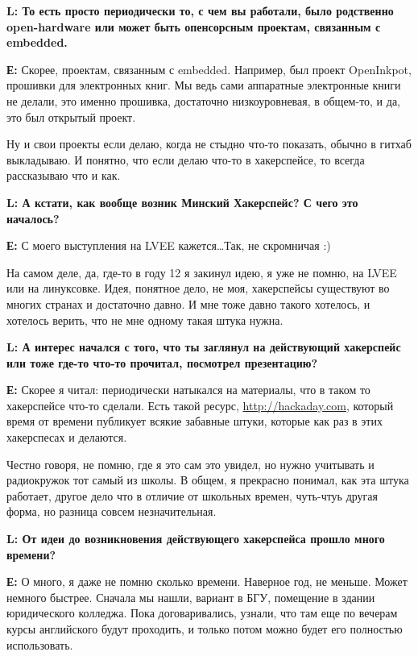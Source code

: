 \documentclass[10pt, a5paper]{article}
\begin{document}
{\noindent \bf L: То есть просто периодически  то, с чем вы работали, было родственно open-hardware или может быть опенсорсным проектам, связанным с embedded.}

{\noindent \bf Е:}  Скорее, проектам, связанным с embedded. Например, был проект OpenInkpot,  прошивки для электронных книг. Мы ведь сами аппаратные электронные книги не делали, это именно прошивка, достаточно низкоуровневая, в общем-то, и да, это был открытый проект.

Ну и свои проекты если делаю, когда не стыдно что-то показать, обычно в гитхаб выкладываю. И понятно, что если делаю что-то в хакерспейсе, то всегда рассказываю что и как.

{\noindent \bf L: А кстати, как вообще возник Минский Хакерспейс? С чего это началось?}

{\noindent \bf Е:} С моего выступления на LVEE кажется\ldots Так, не скромничая :)

На самом деле,  да, где-то в году 12 я закинул идею, я уже не помню, на LVEE или на линуксовке. Идея, понятное дело, не моя, хакерспейсы существуют во многих странах и достаточно давно. И мне тоже давно такого хотелось, и хотелось верить, что не мне одному такая штука нужна.



{\noindent \bf L: А интерес начался с того, что ты заглянул на действующий  хакерспейс или тоже где-то что-то прочитал, посмотрел презентацию?}

{\noindent \bf Е:} Скорее я читал: периодически натыкался на материалы,  что в таком то хакерспейсе что-то сделали. Есть такой ресурс,  \url{http://hackaday.com}, который время от времени публикует всякие забавные штуки, которые как раз в этих хакерспесах и делаются.

Честно говоря, не помню, где я это сам это увидел, но нужно учитывать и радиокружок тот самый из школы. В общем, я прекрасно понимал, как эта штука работает, другое дело что в отличие от школьных времен, чуть-чтуь другая форма, но разница совсем незначительная.

{\noindent \bf L: От идеи до возникновения действующего хакерспейса прошло много времени?}

{\noindent \bf Е:} О много, я даже не помню сколько времени. Наверное год, не меньше. Может немного быстрее.  Сначала мы нашли, вариант в БГУ, помещение в здании юридического колледжа. Пока договаривались, узнали, что там еще по вечерам курсы английского будут проходить, и только потом можно будет его полностью использовать.
\end{document}
